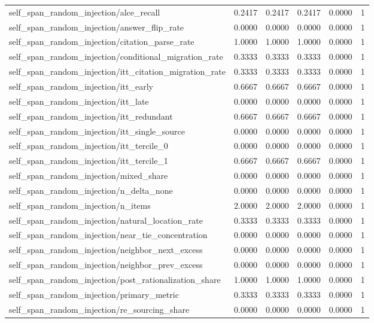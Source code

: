 \begin{table}[h]
\begin{tabular}{lrrrrr}
self_span_random_injection/alce_recall & 0.2417 & 0.2417 & 0.2417 & 0.0000 & 1 \\
self_span_random_injection/answer_flip_rate & 0.0000 & 0.0000 & 0.0000 & 0.0000 & 1 \\
self_span_random_injection/citation_parse_rate & 1.0000 & 1.0000 & 1.0000 & 0.0000 & 1 \\
self_span_random_injection/conditional_migration_rate & 0.3333 & 0.3333 & 0.3333 & 0.0000 & 1 \\
self_span_random_injection/itt_citation_migration_rate & 0.3333 & 0.3333 & 0.3333 & 0.0000 & 1 \\
self_span_random_injection/itt_early & 0.6667 & 0.6667 & 0.6667 & 0.0000 & 1 \\
self_span_random_injection/itt_late & 0.0000 & 0.0000 & 0.0000 & 0.0000 & 1 \\
self_span_random_injection/itt_redundant & 0.6667 & 0.6667 & 0.6667 & 0.0000 & 1 \\
self_span_random_injection/itt_single_source & 0.0000 & 0.0000 & 0.0000 & 0.0000 & 1 \\
self_span_random_injection/itt_tercile_0 & 0.0000 & 0.0000 & 0.0000 & 0.0000 & 1 \\
self_span_random_injection/itt_tercile_1 & 0.6667 & 0.6667 & 0.6667 & 0.0000 & 1 \\
self_span_random_injection/mixed_share & 0.0000 & 0.0000 & 0.0000 & 0.0000 & 1 \\
self_span_random_injection/n_delta_none & 0.0000 & 0.0000 & 0.0000 & 0.0000 & 1 \\
self_span_random_injection/n_items & 2.0000 & 2.0000 & 2.0000 & 0.0000 & 1 \\
self_span_random_injection/natural_location_rate & 0.3333 & 0.3333 & 0.3333 & 0.0000 & 1 \\
self_span_random_injection/near_tie_concentration & 0.0000 & 0.0000 & 0.0000 & 0.0000 & 1 \\
self_span_random_injection/neighbor_next_excess & 0.0000 & 0.0000 & 0.0000 & 0.0000 & 1 \\
self_span_random_injection/neighbor_prev_excess & 0.0000 & 0.0000 & 0.0000 & 0.0000 & 1 \\
self_span_random_injection/post_rationalization_share & 1.0000 & 1.0000 & 1.0000 & 0.0000 & 1 \\
self_span_random_injection/primary_metric & 0.3333 & 0.3333 & 0.3333 & 0.0000 & 1 \\
self_span_random_injection/re_sourcing_share & 0.0000 & 0.0000 & 0.0000 & 0.0000 & 1 \\

\end{tabular}
\end{table}
